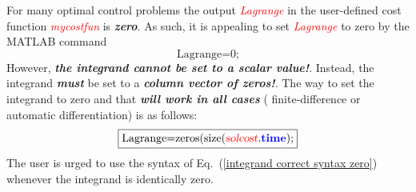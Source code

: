 \documentclass[10pt]{article}
\newcommand{\bfblue}[1]{\textcolor{blue}{\bf #1}}
\newcommand{\slred}[1]{\textcolor{red}{\sl #1}}
\begin{document}

\vspace{10pt}

For many optimal control problems the output \slred{Lagrange} in the
user-defined cost function \slred{mycostfun} is {\bf\em zero}.  As such, it is
appealing to set \slred{Lagrange} to zero by the MATLAB command
\begin{equation}
  \textrm{Lagrange=0;}
\end{equation}
However, {\bf\em the integrand cannot be set to a scalar value!}.  Instead,
the integrand {\bf\em must} be set to a {\bf\em column vector of zeros!}.  The
way to set the integrand to zero and that {\bf\em will work in all cases} (\ie
finite-difference or automatic differentiation) is as follows:
\begin{equation}\label{integrand correct syntax zero}
  \boxed{
    \textrm{Lagrange=zeros(size(\slred{solcost}.\bfblue{time});}
  }
\end{equation}
The user is urged to use the syntax of Eq.~(\ref{integrand correct syntax zero})
whenever the integrand is identically zero.
\end{document}
